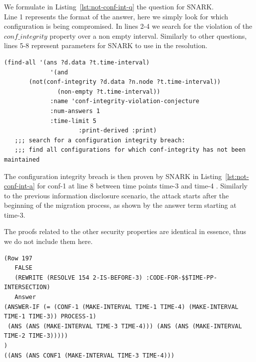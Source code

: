 We formulate in Listing~\ref{lst:not-conf-int-q} the question for SNARK.\\
Line 1 represents the format of the answer, here we simply look for which configuration is being compromised. In lines 2-4 we search for the violation of the $conf\_integrity$ property over a non empty interval. Similarly to other questions, lines 5-8 represent parameters for SNARK to use in the resolution.

\begin{lstlisting}[caption=SNARK question to detect the configuration integrity violation., label=lst:not-conf-int-q,captionpos=b] 
   (find-all '(ans ?d.data ?t.time-interval)
             '(and
       (not(conf-integrity ?d.data ?n.node ?t.time-interval))
               (non-empty ?t.time-interval))
             :name 'conf-integrity-violation-conjecture
             :num-answers 1
             :time-limit 5
                     :print-derived :print)
   ;;; search for a configuration integrity breach:
   ;;; find all configurations for which conf-integrity has not been maintained
\end{lstlisting}

The configuration integrity breach is then proven by SNARK in Listing~\ref{lst:not-conf-int-a} for conf-1 at line 8 between time points time-3 and time-4 .
Similarly to the previous information disclosure scenario, the attack starts after the beginning of the migration process, as shown by the answer term starting at time-3.

The proofs related to the other security properties are identical in essence, thus we do not include them here.

\begin{lstlisting}[caption=SNARK detecting the configuration integrity violation., label=lst:not-conf-int-a,captionpos=b] 
(Row 197
   FALSE
   (REWRITE (RESOLVE 154 2-IS-BEFORE-3) :CODE-FOR-$$TIME-PP-INTERSECTION)
   Answer 
(ANSWER-IF (= (CONF-1 (MAKE-INTERVAL TIME-1 TIME-4) (MAKE-INTERVAL TIME-1 TIME-3)) PROCESS-1)
 (ANS (ANS (MAKE-INTERVAL TIME-3 TIME-4))) (ANS (ANS (MAKE-INTERVAL TIME-2 TIME-3)))))
)
((ANS (ANS CONF1 (MAKE-INTERVAL TIME-3 TIME-4)))

\end{lstlisting}

